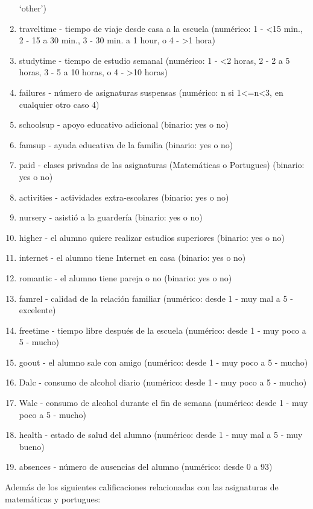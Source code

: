 \documentclass[]{article}
\begin{document}
\begin{enumerate}
  `other')
\item
  traveltime - tiempo de viaje desde casa a la escuela (numérico: 1 -
  \textless{}15 min., 2 - 15 a 30 min., 3 - 30 min. a 1 hour, o 4 -
  \textgreater{}1 hora)
\item
  studytime - tiempo de estudio semanal (numérico: 1 - \textless{}2
  horas, 2 - 2 a 5 horas, 3 - 5 a 10 horas, o 4 - \textgreater{}10
  horas)
\item
  failures - número de asignaturas suspensas (numérico: n si
  1\textless{}=n\textless{}3, en cualquier otro caso 4)
\item
  schoolsup - apoyo educativo adicional (binario: yes o no)
\item
  famsup - ayuda educativa de la familia (binario: yes o no)
\item
  paid - clases privadas de las asignaturas (Matemáticas o Portugues)
  (binario: yes o no)
\item
  activities - actividades extra-escolares (binario: yes o no)
\item
  nursery - asistió a la guardería (binario: yes o no)
\item
  higher - el alumno quiere realizar estudios superiores (binario: yes o
  no)
\item
  internet - el alumno tiene Internet en casa (binario: yes o no)
\item
  romantic - el alumno tiene pareja o no (binario: yes o no)
\item
  famrel - calidad de la relación familiar (numérico: desde 1 - muy mal
  a 5 - excelente)
\item
  freetime - tiempo libre después de la escuela (numérico: desde 1 - muy
  poco a 5 - mucho)
\item
  goout - el alumno sale con amigo (numérico: desde 1 - muy poco a 5 -
  mucho)
\item
  Dalc - consumo de alcohol diario (numérico: desde 1 - muy poco a 5 -
  mucho)
\item
  Walc - consumo de alcohol durante el fin de semana (numérico: desde 1
  - muy poco a 5 - mucho)
\item
  health - estado de salud del alumno (numérico: desde 1 - muy mal a 5 -
  muy bueno)
\item
  absences - número de ausencias del alumno (numérico: desde 0 a 93)
\end{enumerate}

Además de los siguientes calificaciones relacionadas con las asignaturas
de matemáticas y portugues:
\end{document}
